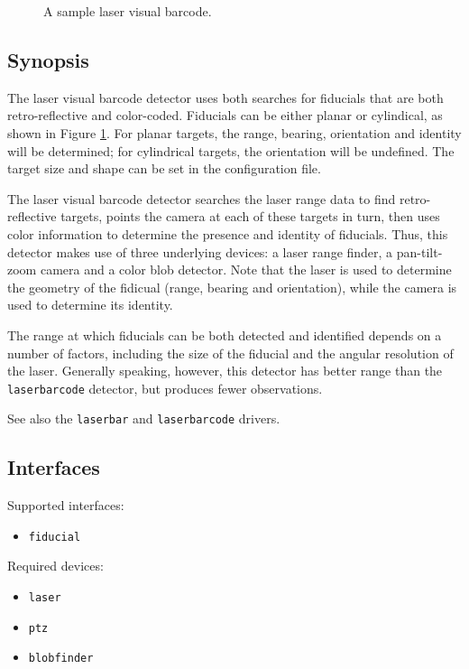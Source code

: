 

\begin{figure}[ht]
\begin{center}
\caption{A sample laser visual barcode.}
\label{fig:laservisualbarcode}
\end{center}
\end{figure}

\subsection*{Synopsis}

The laser visual barcode detector uses both searches for fiducials
that are both retro-reflective and color-coded.  Fiducials can be
either planar or cylindical, as shown in Figure
\ref{fig:laservisualbarcode}.  For planar targets, the range, bearing,
orientation and identity will be determined; for cylindrical targets,
the orientation will be undefined.  The target size and shape can be
set in the configuration file.

The laser visual barcode detector searches the laser range data to
find retro-reflective targets, points the camera at each of these
targets in turn, then uses color information to determine the presence
and identity of fiducials.  Thus, this detector makes use of three
underlying devices: a laser range finder, a pan-tilt-zoom camera and a
color blob detector.  Note that the laser is used to determine the
geometry of the fidicual (range, bearing and orientation), while the
camera is used to determine its identity.

The range at which fiducials can be both detected and identified
depends on a number of factors, including the size of the fiducial and
the angular resolution of the laser.  Generally speaking, however,
this detector has better range than the {\tt laserbarcode} detector,
but produces fewer observations.

See also the {\tt laserbar} and {\tt laserbarcode} drivers.


\subsection*{Interfaces}

\noindent Supported interfaces:
\begin{itemize}
\item {\tt fiducial}
\end{itemize}

\noindent Required devices:
\begin{itemize}
\item {\tt laser}
\item {\tt ptz}
\item {\tt blobfinder}
\end{itemize}

